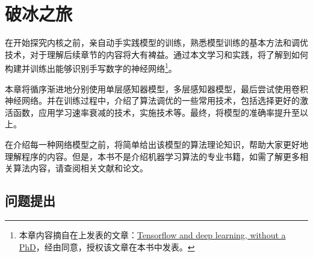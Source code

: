 \begin{savequote}[45mm]
\end{savequote}

\chapter{破冰之旅} 
\label{ch:ice-breaker}

\begin{content}

在开始探究\tf{}内核之前，亲自动手实践模型的训练，熟悉模型训练的基本方法和调优技术，对于理解后续章节的内容将大有裨益。通过本文学习和实践，将了解到如何构建并训练出能够识别手写数字的神经网络\footnote{ 本章内容摘自在上发表的文章：\href{https://codelabs.developers.google.com/codelabs/cloud-tensorflow-mnist}{Tensorflow and deep learning, without a PhD}，经由同意，授权该文章在本书中发表。}。

本章将循序渐进地分别使用单层感知器模型，多层感知器模型，最后尝试使用卷积神经网络。并在训练过程中，介绍了算法调优的一些常用技术，包括选择更好的激活函数，应用学习速率衰减的技术，实施技术等。最终，将模型的准确率提升至以上。

在介绍每一种网络模型之前，将简单给出该模型的算法理论知识，帮助大家更好地理解程序的内容。但是，本书不是介绍机器学习算法的专业书籍，如需了解更多相关算法内容，请查阅相关文献和论文。

\end{content}

\section{问题提出}

